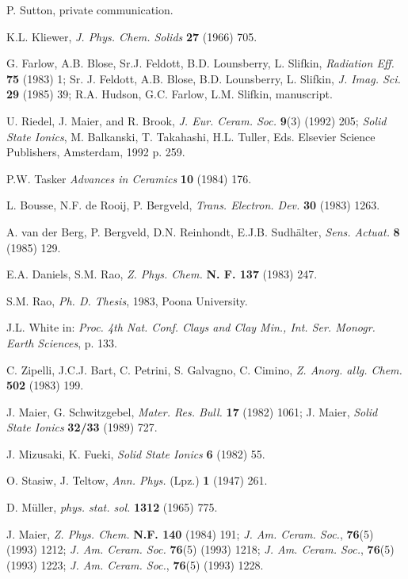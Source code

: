 \documentclass{elsart}
\begin{document}
\begin{thebibliography}{999}
 P. Sutton, private communication.

 K.L. Kliewer, {\em J. Phys. Chem. Solids\/} {\bf 27} (1966) 705. 

 G. Farlow, A.B. Blose, Sr.J. Feldott, B.D. Lounsberry, L.
Slifkin, {\em Radiation Eff.\/} {\bf 75} (1983) 1; Sr. J. Feldott, A.B.
Blose, B.D. Lounsberry, L. Slifkin, {\em J. Imag. Sci.} {\bf 29} (1985) 39;
R.A. Hudson, G.C. Farlow, L.M. Slifkin, manuscript. 

 U. Riedel, J. Maier, and R. Brook, {\em J. Eur. Ceram. Soc.\/}
{\bf 9}(3) (1992) 205; {\em Solid State Ionics}, M. Balkanski, T. Takahashi,
H.L. Tuller, Eds. Elsevier Science Publishers, Amsterdam, 1992 p. 259.

 P.W. Tasker {\em Advances in Ceramics\/} {\bf 10} (1984) 176. 

 L. Bousse, N.F. de Rooij, P. Bergveld, {\em Trans. Electron.
Dev.\/} {\bf 30} (1983) 1263.

 A. van der Berg, P. Bergveld, D.N. Reinhondt, E.J.B.
Sudh\"alter, {\em Sens. Actuat.\/} {\bf 8} (1985) 129.

 E.A. Daniels, S.M. Rao, {\em Z. Phys. Chem.\/} {\bf N. F. 137}
  (1983) 247. 

 S.M. Rao, {\em Ph. D. Thesis\/}, 1983, Poona University.

 J.L. White in: {\em Proc. 4th Nat. Conf. Clays and Clay Min.,
Int. Ser. Monogr. Earth Sciences\/}, p. 133.

 C. Zipelli, J.C.J. Bart, C. Petrini, S. Galvagno, C. Cimino,
{\em Z. Anorg. allg. Chem.\/} {\bf 502} (1983) 199.

 J. Maier, G. Schwitzgebel, {\em Mater. Res. Bull.\/} {\bf 17} 
(1982) 1061; J. Maier, {\em Solid State Ionics\/} {\bf 32/33} (1989) 727. 

 J. Mizusaki, K. Fueki, {\em Solid State Ionics\/} {\bf 6}
(1982) 55. 

 O. Stasiw, J. Teltow, {\em Ann. Phys.\/} (Lpz.) {\bf 1}
(1947) 261. 

 D. M\"uller, {\em phys. stat. sol.\/} {\bf 1312} (1965) 775.

 J. Maier, {\em Z. Phys. Chem.\/} {\bf N.F. 140} (1984) 191;
{\em J. Am. Ceram. Soc.\/}, {\bf 76}(5) (1993) 1212; {\em J. Am. Ceram.
  Soc.\/} {\bf 76}(5) (1993) 1218; {\em J. Am. Ceram. Soc.\/}, {\bf 76}(5)
(1993) 1223; {\em J. Am. Ceram. Soc.\/}, {\bf 76}(5) (1993) 1228.  


\end{thebibliography}
\end{document}
